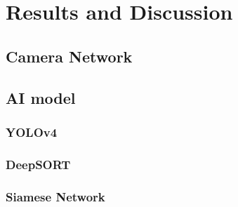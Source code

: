 \chapter{Results and Discussion}
\lipsum[1]

\section{Camera Network}
\lipsum[1]

\section{AI model}
\subsection{YOLOv4}
\lipsum[1]

\subsection{DeepSORT}
\lipsum[1]

\subsection{Siamese Network}
\lipsum[1]




